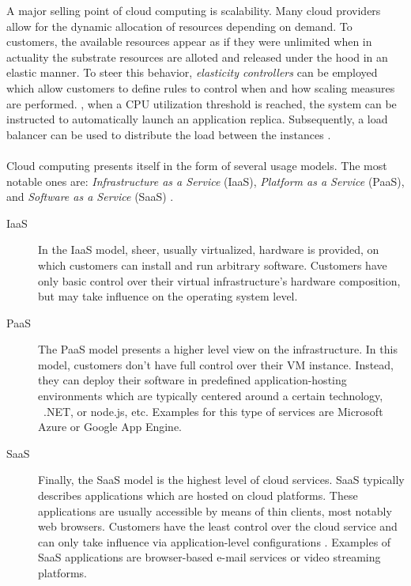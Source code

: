 A major selling point of cloud computing is scalability. Many cloud providers allow for the dynamic allocation of resources depending on demand. To customers, the available resources appear as if they were unlimited when in actuality the substrate resources are alloted and released under the hood in an elastic manner. To steer this behavior, \emph{elasticity controllers} can be employed which allow customers to define rules to control when and how scaling measures are performed. \Eg , when a CPU utilization threshold is reached, the system can be instructed to automatically launch an application replica. Subsequently, a load balancer can be used to distribute the load between the instances \cite{vaquero2011dynamically}.


\paragraph{}
Cloud computing presents itself in the form of several usage models. The most notable ones are: \emph{Infrastructure as a Service} (IaaS),  \emph{Platform as a Service} (PaaS),  and \emph{Software as a Service} (SaaS) \cite{mell2011nist}.

\begin{description}
\item[IaaS] In the IaaS model, sheer, usually virtualized, hardware is provided, on which customers can install and run arbitrary software. Customers have only basic control over their virtual infrastructure's hardware composition, but may take influence on the operating system level.
\item[PaaS] The PaaS model presents a higher level view on the infrastructure. In this model, customers don't have full control over their VM instance. Instead, they can deploy their software in predefined application-hosting environments \cite{mell2011nist} which are typically centered around a certain technology, \eg\ .NET, or node.js, etc. Examples for this type of services are Microsoft Azure or Google App Engine.
\item[SaaS] Finally, the SaaS model is the highest level of cloud services. SaaS typically describes applications which are hosted on cloud platforms. These applications are usually accessible by means of thin clients, most notably web browsers. Customers have the least control over the cloud service and can only take influence via application-level configurations \cite{mell2011nist}. Examples of SaaS applications are browser-based e-mail services or video streaming platforms.
\end{description}


